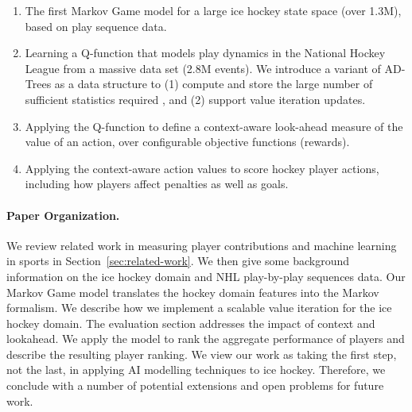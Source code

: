 \documentclass[]{article}
\begin{document}
\begin{enumerate}
\item The first Markov Game model for a large ice hockey state space (over 1.3M), based on play sequence data. %
\item Learning a Q-function that models play dynamics in the National Hockey League from a massive data set (2.8M events). We introduce a variant of AD-Trees as a data structure to (1) compute and store the large number of sufficient statistics required \citep{Moore1998}, and (2) support value iteration updates.
\item Applying the Q-function to define a context-aware look-ahead measure of the value of an action, over configurable objective functions (rewards).
\item Applying the context-aware action values to score hockey player actions, including how players affect penalties as well as goals.
\end{enumerate}


\paragraph{Paper Organization.}

We review related work in measuring player contributions and machine learning in sports in Section~\ref{sec:related-work}. We then give some background information on the ice hockey domain and NHL play-by-play sequences data. Our Markov Game model translates the hockey domain features into the Markov formalism. We describe how we implement a scalable value iteration for the ice hockey domain. The evaluation section addresses the impact of context and lookahead.
We apply the model to rank the aggregate performance of players and describe the resulting player ranking. We view our work as taking the first step, not the last, in applying AI modelling techniques to ice hockey.
Therefore, we conclude with a number of potential extensions and open problems for future work.
\end{document}
